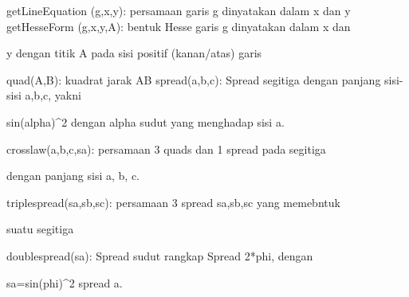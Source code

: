 \documentclass[a4paper,10pt]{article}
\begin{document}
\begin{eulernotebook}
\begin{eulercomment}
\begin{eulercomment}
\begin{eulercomment}
\begin{eulercomment}
\begin{eulercomment}
\begin{eulercomment}
\begin{eulercomment}
\begin{eulercomment}
\begin{eulercomment}
\end{eulercomment}
\begin{eulerttcomment}
  getLineEquation (g,x,y): persamaan garis g dinyatakan dalam x dan y
  getHesseForm (g,x,y,A): bentuk Hesse garis g dinyatakan dalam x dan
\end{eulerttcomment}
\begin{eulercomment}
y dengan titik A pada sisi positif (kanan/atas) garis\\
\end{eulercomment}
\begin{eulerttcomment}
  quad(A,B): kuadrat jarak AB
  spread(a,b,c): Spread segitiga dengan panjang sisi-sisi a,b,c, yakni
\end{eulerttcomment}
\begin{eulercomment}
sin(alpha)\textasciicircum{}2 dengan alpha sudut yang menghadap sisi a.\\
\end{eulercomment}
\begin{eulerttcomment}
  crosslaw(a,b,c,sa): persamaan 3 quads dan 1 spread pada segitiga
\end{eulerttcomment}
\begin{eulercomment}
dengan panjang sisi a, b, c.\\
\end{eulercomment}
\begin{eulerttcomment}
  triplespread(sa,sb,sc): persamaan 3 spread sa,sb,sc yang memebntuk
\end{eulerttcomment}
\begin{eulercomment}
suatu segitiga\\
\end{eulercomment}
\begin{eulerttcomment}
  doublespread(sa): Spread sudut rangkap Spread 2*phi, dengan
\end{eulerttcomment}
\begin{eulercomment}
sa=sin(phi)\textasciicircum{}2 spread a.


\end{eulercomment}
\end{eulercomment}
\end{eulercomment}
\end{eulercomment}
\end{eulercomment}
\end{eulercomment}
\end{eulercomment}
\end{eulercomment}
\end{eulercomment}
\end{eulernotebook}
\end{document}
